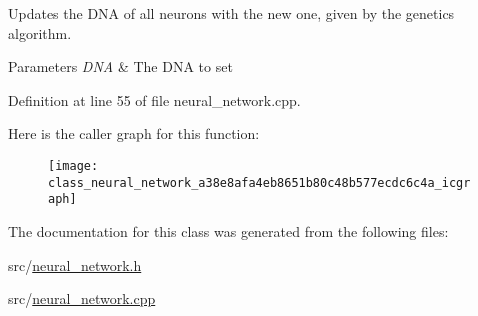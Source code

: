 Updates the D\-N\-A of all neurons with the new one, given by the genetics algorithm. 


\begin{DoxyParams}{Parameters}
{\em D\-N\-A} & The D\-N\-A to set \\
\hline
\end{DoxyParams}


Definition at line 55 of file neural\-\_\-network.\-cpp.



Here is the caller graph for this function\-:
\nopagebreak
\begin{figure}[H]
\begin{center}
\leavevmode
\texttt{[image: class\_neural\_network\_a38e8afa4eb8651b80c48b577ecdc6c4a\_icgraph]}
\end{center}
\end{figure}




The documentation for this class was generated from the following files\-:\begin{DoxyCompactItemize}
\item 
src/\hyperlink{neural__network_8h}{neural\-\_\-network.\-h}\item 
src/\hyperlink{neural__network_8cpp}{neural\-\_\-network.\-cpp}\end{DoxyCompactItemize}
